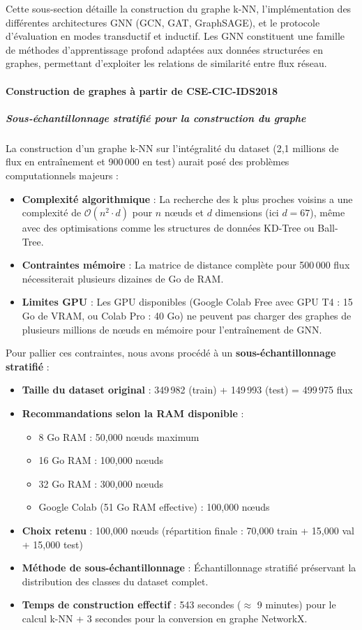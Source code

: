 ﻿\documentclass[11pt,a4paper]{article}
\begin{document}
Cette sous-section détaille la construction du graphe k-NN, l'implémentation des différentes architectures GNN (GCN, GAT, GraphSAGE), et le protocole d'évaluation en modes transductif et inductif. Les GNN constituent une famille de méthodes d'apprentissage profond adaptées aux données structurées en graphes, permettant d'exploiter les relations de similarité entre flux réseau.

\paragraph{Construction de graphes à partir de CSE-CIC-IDS2018}

\subparagraph{Sous-échantillonnage stratifié pour la construction du graphe}

La construction d'un graphe k-NN sur l'intégralité du dataset (2,1 millions de flux en entraînement et 900\,000 en test) aurait posé des problèmes computationnels majeurs :
\begin{itemize}
    \item \textbf{Complexité algorithmique} : La recherche des k plus proches voisins a une complexité de $\mathcal{O}(n^2 \cdot d)$ pour $n$ nœuds et $d$ dimensions (ici $d = 67$), même avec des optimisations comme les structures de données KD-Tree ou Ball-Tree.
    \item \textbf{Contraintes mémoire} : La matrice de distance complète pour 500\,000 flux nécessiterait plusieurs dizaines de Go de RAM.
    \item \textbf{Limites GPU} : Les GPU disponibles (Google Colab Free avec GPU T4 : 15 Go de VRAM, ou Colab Pro : 40 Go) ne peuvent pas charger des graphes de plusieurs millions de nœuds en mémoire pour l'entraînement de GNN.
\end{itemize}

Pour pallier ces contraintes, nous avons procédé à un \textbf{sous-échantillonnage stratifié} :
\begin{itemize}
    \item \textbf{Taille du dataset original} : 349\,982 (train) + 149\,993 (test) = 499\,975 flux
    \item \textbf{Recommandations selon la RAM disponible} :
    \begin{itemize}
        \item 8 Go RAM : 50,000 nœuds maximum
        \item 16 Go RAM : 100,000 nœuds
        \item 32 Go RAM : 300,000 nœuds
        \item Google Colab (51 Go RAM effective) : 100,000 nœuds
    \end{itemize}
    \item \textbf{Choix retenu} : 100,000 nœuds (répartition finale : 70,000 train + 15,000 val + 15,000 test)
    \item \textbf{Méthode de sous-échantillonnage} : Échantillonnage stratifié préservant la distribution des classes du dataset complet.
    \item \textbf{Temps de construction effectif} : 543 secondes ($\approx$ 9 minutes) pour le calcul k-NN + 3 secondes pour la conversion en graphe NetworkX.
\end{itemize}
\end{document}

